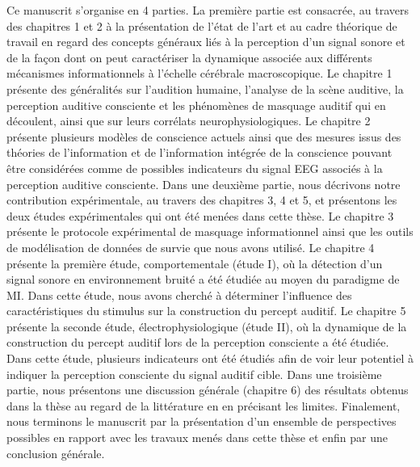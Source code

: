 Ce manuscrit s'organise en 4 parties. 
La première partie est consacrée, au travers des chapitres 1 et 2 à la présentation de l'état de l'art et au cadre théorique de travail en regard des concepts généraux liés à la perception d'un signal sonore et de la façon dont on peut caractériser la dynamique associée aux différents mécanismes informationnels à l'échelle cérébrale macroscopique. 
Le chapitre 1 présente des généralités sur l'audition humaine, l'analyse de la scène auditive, la perception auditive consciente et les phénomènes de masquage auditif qui en découlent, ainsi que sur leurs corrélats neurophysiologiques.  
Le chapitre 2 présente plusieurs modèles de conscience actuels ainsi que des mesures issus des théories de l'information et de l'information intégrée de la conscience pouvant être considérées comme de possibles indicateurs du signal EEG associés à la perception auditive consciente. 
Dans une deuxième partie, nous décrivons notre contribution expérimentale, au travers des chapitres 3, 4 et 5, et présentons les deux études expérimentales qui ont été menées dans cette thèse. 
Le chapitre 3 présente le protocole expérimental de masquage informationnel ainsi que les outils de modélisation de données de survie que nous avons utilisé. 
Le chapitre 4 présente la première étude, comportementale (étude I), où la détection d'un signal sonore en environnement bruité a été étudiée au moyen du paradigme de MI. 
Dans cette étude, nous avons cherché à déterminer l'influence des caractéristiques du stimulus sur la construction du percept auditif. 
Le chapitre 5 présente la seconde étude, électrophysiologique (étude II), où la dynamique de la construction du percept auditif lors de la perception consciente a été étudiée. 
Dans cette étude, plusieurs indicateurs ont été étudiés afin de voir leur potentiel à indiquer la perception consciente du signal auditif cible. 
Dans une troisième partie, nous présentons une discussion générale (chapitre 6) des résultats obtenus dans la thèse au regard de la littérature en en précisant les limites. 
Finalement, nous terminons le manuscrit par la présentation d'un ensemble de perspectives possibles en rapport avec les travaux menés dans cette thèse et enfin par une conclusion générale.

\clearpage\null\newpage
